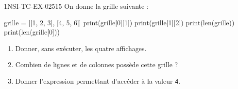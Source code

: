 \begin{exercice}{1NSI-TC-EX-025}{1}{5}
On donne la grille suivante :
\begin{python}
grille = [[1, 2, 3],
           [4, 5, 6]]
print(grille[0][1])
print(grille[1][2])
print(len(grille))
print(len(grille[0]))
\end{python}
\begin{enumerate}
  \item Donner, sans exécuter, les quatre affichages.
  \item Combien de lignes et de colonnes possède cette grille ?
  \item Donner l'expression permettant d'accéder à la valeur \lstinline{4}.
\end{enumerate}
\end{exercice}
